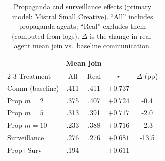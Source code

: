 \begin{table}[t]
\centering
\caption{Propaganda and surveillance effects (primary model: Mistral Small Creative). ``All'' includes propaganda agents; ``Real'' excludes them (computed from logs). $\Delta$ is the change in real-agent mean join vs.\ baseline communication.}
\label{tab:surveillance_propaganda}
\small
\begin{tabular}{lcccc}
\toprule
 & \multicolumn{2}{c}{Mean join} & & \\
\cmidrule(lr){2-3}
Treatment & All & Real & $r$ & $\Delta$ (pp) \\
\midrule
Comm (baseline) & .411 & .411 & $+0.737$ & --- \\
\midrule
Prop $m=2$ & .375 & .407 & $+0.724$ & -0.4 \\
Prop $m=5$ & .313 & .391 & $+0.717$ & -2.0 \\
Prop $m=10$ & .233 & .388 & $+0.716$ & -2.3 \\
\midrule
Surveillance & .276 & .276 & $+0.681$ & -13.5 \\
Prop+Surv & .194 & --- & $+0.611$ & --- \\
\bottomrule
\end{tabular}
\end{table}
